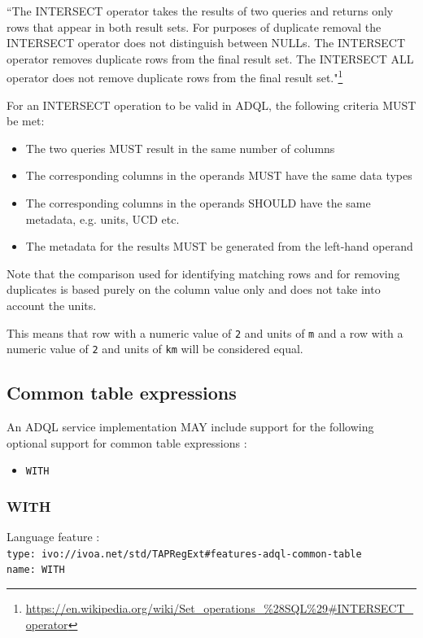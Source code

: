 \documentclass[11pt,a4paper]{ivoa}
\begin{document}
``The INTERSECT operator takes the results of two queries and returns only
rows that appear in both result sets. For purposes of duplicate removal
the INTERSECT operator does not distinguish between NULLs. The INTERSECT
operator removes duplicate rows from the final result set. The INTERSECT
ALL operator does not remove duplicate rows from the final result set."\footnote{\url{https://en.wikipedia.org/wiki/Set\_operations\_\%28SQL\%29\#INTERSECT\_operator}}

For an INTERSECT operation to be valid in ADQL, the following criteria MUST be met:

\begin{itemize}
    \item The two queries MUST result in the same number of columns
    \item The corresponding columns in the operands MUST have the same data types
    \item The corresponding columns in the operands SHOULD have the same metadata, e.g. units, UCD etc.
    \item The metadata for the results MUST be generated from the left-hand operand
\end{itemize}

Note that the comparison used for identifying matching rows and for removing
duplicates is based purely on the column value only and does not take into
account the units.

This means that row with a numeric value of \verb:2: and units of \verb:m:
and a row with a numeric value of \verb:2: and units of \verb:km: will be
considered equal.

\subsection{Common table expressions}
\label{sec:common-table}

An ADQL service implementation MAY include support for the following optional
support for common table expressions :

\begin{itemize}
    \item \verb:WITH:
\end{itemize}

\subsubsection{WITH}
{\footnotesize Language feature :}\\
{\footnotesize \verb|type: ivo://ivoa.net/std/TAPRegExt#features-adql-common-table|}\\
{\footnotesize \verb|name: WITH|}\\
\end{document}
